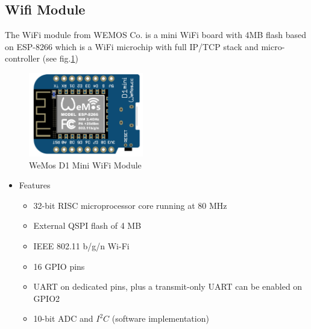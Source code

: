 \subsection{Wifi Module}
The WiFi module from WEMOS Co.\cite{wemosd1mini} is a mini WiFi board with 4MB flash based on ESP-8266 which is a WiFi microchip with full IP/TCP stack and micro-controller (see fig.\ref{wemos})
\begin{figure}[!htbp]
	\centering
	\includegraphics[width = 5cm]{Pictures/wemos}
	\caption{WeMos D1 Mini WiFi Module}
	\label{wemos}
\end{figure}
\begin{itemize}
	\item Features
	\begin{itemize}
		\item 32-bit RISC microprocessor core running at 80 MHz
		\item External QSPI flash of 4 MB
		\item IEEE 802.11 b/g/n Wi-Fi
		\item 16 GPIO pins
		\item UART on dedicated pins, plus a transmit-only UART can be enabled on GPIO2
		\item 10-bit ADC and \(I^2C\) (software implementation)
	\end{itemize}
\end{itemize}
